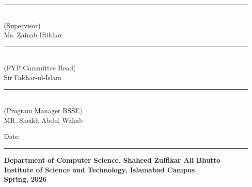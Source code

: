 \noindent
\begin{minipage}{0.48\textwidth}
\centering
\rule{6cm}{0.4pt}\\[4pt]
(Supervisor)\\
Ms. Zainab Iftikhar
\end{minipage}
\hfill
\begin{minipage}{0.48\textwidth}
\centering
\rule{6cm}{0.4pt}\\[4pt]
(FYP Committee Head)\\
Sir Fakhar-ul-Islam
\end{minipage}

\vspace{1.5cm}

\noindent
\begin{minipage}{0.48\textwidth}
\centering
\rule{6cm}{0.4pt}\\[4pt]
(Program Manager BSSE)\\
MR. Sheikh Abdul Wahab
\end{minipage}
\hfill
\begin{minipage}{0.48\textwidth}
\centering
Date: \rule{4.5cm}{0.4pt}
\end{minipage}

\vfill

\begin{center}
\normalsize\textbf{Department of Computer Science, Shaheed Zulfikar Ali Bhutto Institute of Science and Technology, Islamabad Campus}\\
\vspace{6pt}
\normalsize\textbf{Spring, 2026}
\end{center}